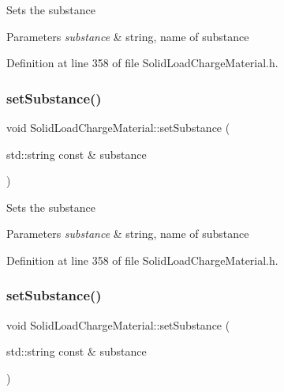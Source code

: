 Sets the substance 
\begin{DoxyParams}{Parameters}
{\em substance} & string, name of substance \\
\hline
\end{DoxyParams}


Definition at line 358 of file Solid\+Load\+Charge\+Material.\+h.

\mbox{\label{class_solid_load_charge_material_aebe376ab016f48678c3a70390b4ea52a}} 
\subsubsection{\texorpdfstring{set\+Substance()}{setSubstance()}\hspace{0.1cm}{\footnotesize\ttfamily [2/3]}}
{\footnotesize\ttfamily void Solid\+Load\+Charge\+Material\+::set\+Substance (\begin{DoxyParamCaption}\item[{std\+::string const \&}]{substance }\end{DoxyParamCaption})\hspace{0.3cm}{\ttfamily [inline]}}

Sets the substance 
\begin{DoxyParams}{Parameters}
{\em substance} & string, name of substance \\
\hline
\end{DoxyParams}


Definition at line 358 of file Solid\+Load\+Charge\+Material.\+h.

\mbox{\label{class_solid_load_charge_material_aebe376ab016f48678c3a70390b4ea52a}} 
\subsubsection{\texorpdfstring{set\+Substance()}{setSubstance()}\hspace{0.1cm}{\footnotesize\ttfamily [3/3]}}
{\footnotesize\ttfamily void Solid\+Load\+Charge\+Material\+::set\+Substance (\begin{DoxyParamCaption}\item[{std\+::string const \&}]{substance }\end{DoxyParamCaption})\hspace{0.3cm}{\ttfamily [inline]}}

